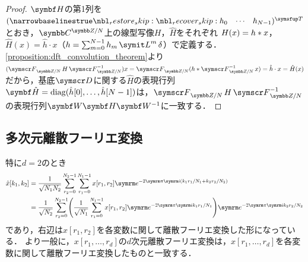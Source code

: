 \documentclass[../../main]{subfiles}
\begin{document}
\begin{proof}
  \(\mat{H}\)の第1列を\(\trps{\rowvect{h_0 & \cdots & h_{N-1}}}\)とおき，\(\cycles{\numset{C}}{N}\)上の線型写像\(H\)，\(\hat{H}\)をそれぞれ
  \(H(x)=h\ast x\)，\(\hat{H}(x)=\hat{h}\cdot x\)（\(h=\sum_{m=0}^{N-1}h_m\lagop^m\delta\)）で定義する．\cref{proposition:dft_convolution_theorem}より
  \((\dft{N}H\dft{N}^{-1})x=\dft{N}(h\circconv\dft{N}^{-1}x)=\hat{h}\cdot x=\hat{H}(x)\)だから，基底\(\basis{D}\)に関する\(\hat{H}\)の表現行列\(\mat{\hat{H}}=\diag(\hat{h}[0],\dots,\hat{h}[N-1])\)は，\(\dft{N}H\dft{N}^{-1}\)の表現行列\(\mat{W}\mat{H}\mat{W}^{-1}\)に一致する．
\end{proof}

\subsection{多次元離散フーリエ変換}


特に\(d=2\)のとき
\begin{align*}
  \hat{x}[k_1,k_2] &= \frac{1}{\sqrt{N_1N_2}}\sum_{r_2=0}^{N_2-1}\sum_{r_1=0}^{N_1-1}x[r_1,r_2]\napr^{-2\krez\iuni(k_1r_1/N_1+k_2r_2/N_2)} \\
  &= \frac{1}{\sqrt{N_2}}\sum_{r_2=0}^{N_2-1}\pqty*{\frac{1}{\sqrt{N_1}}\sum_{r_1=0}^{N_1-1}x[r_1,r_2]\napr^{-2\krez\iuni k_1r_1/N_1}}\napr^{-2\krez\iuni k_2r_2/N_2}
\end{align*}
であり，右辺は\(x[r_1,r_2]\)を各変数に関して離散フーリエ変換した形になっている．
より一般に，\(x[r_1,\dots,r_d]\)の\(d\)次元離散フーリエ変換は，\(x[r_1,\dots,r_d]\)を各変数に関して離散フーリエ変換したものと一致する．
\end{document}

